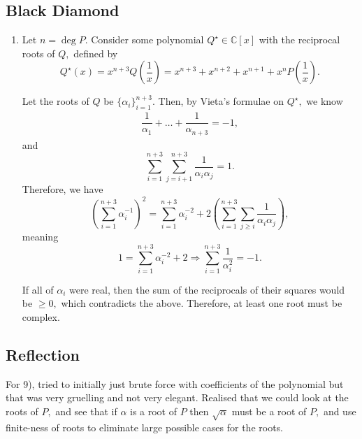\documentclass[12pt]{article}
\begin{document}
\subsection{Black Diamond}
\begin{enumerate}
  \item[11] Let $n = \deg P.$ Consider some polynomial $Q^\star \in
    \mathbb C[x]$ with the reciprocal roots of $Q,$ defined by
    $$
    Q^\star(x) = x^{n + 3}Q\left(\dfrac{1}{x}\right)= x^{n + 3} +
    x^{n + 2}+ x^{n + 1} + x^n P\left(\dfrac{1}{x}\right).
    $$

    Let the roots of $Q$ be $\{\alpha_i\}_{i = 1}^{n + 3}.$ Then, by
    Vieta's formulae on $Q^\star,$ we know
    \begin{align*}
      \dfrac{1}{\alpha_1} + \ldots + \dfrac{1}{\alpha_{n + 3}} = -1,
    \end{align*}
    and $$
    \sum_{i = 1}^{n + 3} \sum_{j = i + 1}^{n + 3} \dfrac{1}{\alpha_i
    \alpha_j} = 1.
    $$
    Therefore, we have
    $$
    \left(\sum_{i = 1}^{n + 3}\alpha_i^{-1}\right)^2 = \sum_{i =
    1}^{n + 3} \alpha_i^{-2} + 2\left(
      \sum_{i = 1}^{n + 3} \sum_{j \geq i} \dfrac{1}{\alpha_i \alpha_j}
    \right),
    $$
    meaning
    $$
    1 = \sum_{i = 1}^{n + 3} \alpha_i^{-2} + 2 \Rightarrow \sum_{i =
    1}^{n + 3} \dfrac{1}{\alpha_i^2} = -1.
    $$

    If all of $\alpha_i$ were real, then the sum of the reciprocals
    of their squares would be $\geq 0,$ which contradicts the above.
    Therefore, at least one root must be complex.
\end{enumerate}

\subsection{Reflection}
For 9), tried to initially just brute force with coefficients of the
polynomial but that was very gruelling and not very elegant. Realised
that we could look at the roots of $P,$ and see that if $\alpha$ is a
root of $P$ then $\sqrt{\alpha}$ must be a root of $P,$ and use
finite-ness of roots to eliminate large possible cases for the roots.
\end{document}
